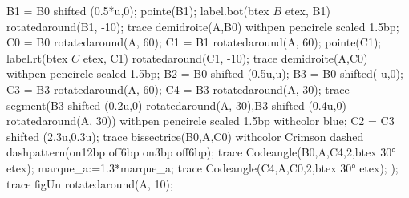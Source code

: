 \begin{changemargin}{0mm}{-15mm}
\begin{methode}
\begin{Geometrie}[CoinHD={(8.5u,5u)}]
                B1 = B0 shifted (0.5*u,0);
                pointe(B1);
                label.bot(btex $B$ etex, B1)  rotatedaround(B1, -10);
                trace demidroite(A,B0) withpen pencircle scaled 1.5bp;
                C0 = B0 rotatedaround(A, 60);
                C1 = B1 rotatedaround(A, 60);
                pointe(C1);
                label.rt(btex $C$ etex, C1)  rotatedaround(C1, -10);            
                trace demidroite(A,C0) withpen pencircle scaled 1.5bp;
                B2 = B0 shifted (0.5u,u);
                B3 = B0 shifted(-u,0);
                C3 = B3 rotatedaround(A, 60);
                C4 = B3 rotatedaround(A, 30);
                trace segment(B3 shifted (0.2u,0) rotatedaround(A, 30),B3 shifted (0.4u,0) rotatedaround(A, 30)) withpen pencircle scaled 1.5bp withcolor blue;
                C2 = C3 shifted (2.3u,0.3u);
                trace bissectrice(B0,A,C0) withcolor Crimson dashed dashpattern(on12bp off6bp on3bp off6bp);
                trace Codeangle(B0,A,C4,2,btex \ang{30} etex);
                marque_a:=1.3*marque_a;
                trace Codeangle(C4,A,C0,2,btex \ang{30} etex);
            );
            trace figUn rotatedaround(A, 10);
        \end{Geometrie}
    \end{methode}


\end{changemargin}
